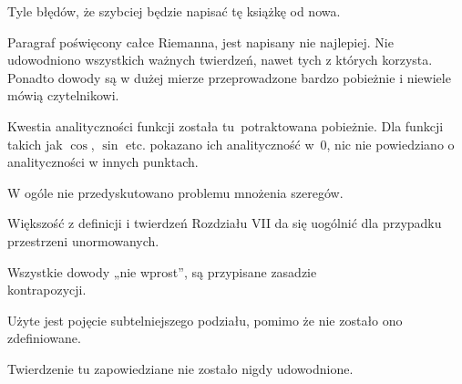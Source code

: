 \documentclass[a4paper,11pt]{article}
\begin{document}


\start Tyle błędów, że szybciej będzie napisać tę
książkę od nowa.

\vspace{\spaceFour}



\start Paragraf poświęcony całce Riemanna, jest napisany nie
najlepiej. Nie udowodniono wszystkich ważnych twierdzeń, nawet tych z
których korzysta. Ponadto dowody są w dużej mierze przeprowadzone
bardzo pobieżnie i niewiele mówią czytelnikowi.

\vspace{\spaceFour}



\start Kwestia analityczności funkcji została tu~potraktowana
pobieżnie. Dla funkcji takich jak $\cos$, $\sin$ etc. pokazano ich
analityczność w~0, nic nie powiedziano o analityczności w innych
punktach.

\vspace{\spaceFour}



\start W ogóle nie przedyskutowano problemu mnożenia szeregów.

\vspace{\spaceFour}



\start Większość z definicji i twierdzeń Rozdziału VII da się uogólnić
dla przypadku przestrzeni unormowanych.

\vspace{\spaceFour}






\start {} Wszystkie dowody „nie wprost”, są przypisane
zasadzie \\
kontrapozycji.

\vspace{\spaceFour}



\start {} Użyte jest pojęcie subtelniejszego podziału, pomimo że
nie zostało ono zdefiniowane.

\vspace{\spaceFour}



\start {} Twierdzenie tu zapowiedziane nie zostało nigdy
udowodnione.

\vspace{\spaceFour}
\end{document}

